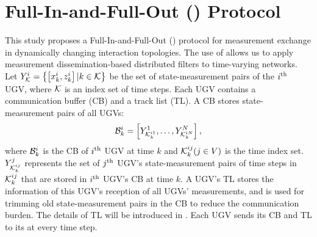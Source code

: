 \section{Full-In-and-Full-Out (\proto) Protocol}\label{sec:\proto}		
	\textcolor{\revcol}{This study proposes a Full-In-and-Full-Out (\proto) protocol for measurement exchange in dynamically changing interaction topologies.
	The use of {\proto} allows us to apply measurement dissemination-based distributed filters to time-varying networks.}
	Let \small$Y^i_{\mathcal{K}}=\left\lbrace \left[x^i_k,z^i_k\right]|k\in \mathcal{K}\right\rbrace$\normalsize 
	be the set of state-measurement pairs of the $i^\text{th}$ UGV, where $\mathcal{K}$ is an index set of time steps.
	Each UGV contains a communication buffer (CB) and a track list (TL). 
	A CB stores state-measurement pairs 
	of all UGVs:
	\small\begin{equation*}		
		\mathcal{B}^i_k=\left[ Y^1_{\mathcal{K}^{i1}_k},\dots,Y^N_{\mathcal{K}^{iN}_k}\right],
	\end{equation*}\normalsize
	where $\mathcal{B}^i_k$ is the CB of $i^\text{th}$ UGV at time $k$ and $\mathcal{K}^{ij}_k (j\in V)$ is the time index set.
	$Y^j_{\mathcal{K}^{ij}_k}$ represents the set of $j^\text{th}$ UGV's state-measurement pairs of time steps in $\mathcal{K}^{ij}_k$ that are stored in $i^\text{th}$ UGV's CB at time $k$. 
	\textcolor{\revcol}{A UGV's TL stores the information of this UGV's reception of all UGVs' measurements, and is used for trimming old state-measurement pairs in the CB to reduce the communication burden.}
	The details of TL will be introduced in .
	Each UGV sends its CB and TL to its {\onbhd} at every time step.
	
